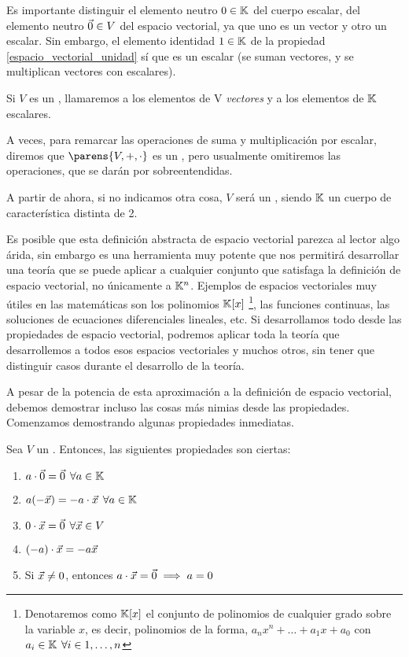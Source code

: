 \documentclass[../algebra_lineal.tex]{subfiles}
\begin{document}
\begin{remark}
    Es importante distinguir el elemento neutro $0 \in \mathbb{K}$ del cuerpo escalar, del elemento neutro $\vec{0} \in V$ del espacio vectorial, ya que uno es un vector y otro un escalar. Sin embargo, el elemento identidad $1 \in \mathbb{K}$ de la propiedad \ref{espacio_vectorial_unidad} sí que es un escalar (se suman vectores, y se multiplican vectores con escalares).  
\end{remark}

\begin{notation}
    Si $V$ es un \kvspace, llamaremos a los elementos de V \textit{vectores} y a los elementos de $\mathbb{K}$ escalares.
\end{notation}

\begin{notation}
    A veces, para remarcar las operaciones de suma y multiplicación por escalar, diremos que $\parens{V, +, \cdot}$ es un \kvspace, pero usualmente omitiremos las operaciones, que se darán por sobreentendidas.
\end{notation}

A partir de ahora, si no indicamos otra cosa, $V$ será un \kvspace, siendo $\mathbb{K}$ un cuerpo de característica distinta de 2.

Es posible que esta definición abstracta de espacio vectorial parezca al lector algo árida, sin embargo es una herramienta muy potente que nos permitirá desarrollar una teoría que se puede aplicar a cualquier conjunto que satisfaga la definición de espacio vectorial, no únicamente a $\mathbb{K}^n$. Ejemplos de espacios vectoriales muy útiles en las matemáticas son los polinomios $\mathbb{K}[x]$ \footnote{Denotaremos como $\mathbb{K}[x]$ el conjunto de polinomios de cualquier grado sobre la variable $x$, es decir, polinomios de la forma, $a_n x^n + \dots + a_1 x + a_0$ con $a_i \in \mathbb{K} \hspace{1.5mm} \forall i \in {1, \dots, n}$}, las funciones continuas, las soluciones de ecuaciones diferenciales lineales, etc. Si desarrollamos todo desde las propiedades de espacio vectorial, podremos aplicar toda la teoría que desarrollemos a todos esos espacios vectoriales y muchos otros, sin tener que distinguir casos durante el desarrollo de la teoría.

A pesar de la potencia de esta aproximación a la definición de espacio vectorial, debemos demostrar incluso las cosas más nimias desde las propiedades. Comenzamos demostrando algunas propiedades inmediatas.

\begin{proposition}
    Sea $V$ un \kvspace. Entonces, las siguientes propiedades son ciertas:
    \begin{enumerate}
        \item $a \cdot \vec{0} = \vec{0} \hspace{1.5mm} \forall a \in \mathbb{K}$
        \item $a(-\vec{x}) = -a\cdot \vec{x} \hspace{1.5mm} \forall a \in \mathbb{K}$
        \item $0 \cdot \vec{x} = \vec{0} \hspace{1.5mm} \forall \vec{x} \in V$
        \item \label{propiedad_cuatro_espacios_vectoriales} $(-a)\cdot \vec{x} = -a\vec{x}$
        \item Si $\vec{x} \ne 0$, entonces $a \cdot \vec{x} = \vec{0} \implies a = 0$
    \end{enumerate}
\end{proposition}
\end{document}
